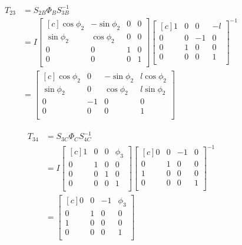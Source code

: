 \documentclass[onecolumn,10pt]{jhwhw}
\begin{document}
\begin{align*}
T_{23} &= S_{2B} \Phi_B S_{3B}^{-1} \\
&= I 
\begin{bmatrix*}[c]
\cos \phi_2 & -\sin \phi_2 & 0 & 0 \\
\sin \phi_2 &  \cos \phi_2 & 0 & 0 \\
          0 &            0 & 1 & 0 \\
          0 &            0 & 0 & 1 \\
\end{bmatrix*}
\begin{bmatrix*}[c]
1 & 0 & 0 & -l \\
0 & 0 & -1 & 0 \\
0 & 1 & 0 & 0 \\
0 & 0 & 0 & 1 \\
\end{bmatrix*}^{-1} \\
&= 
\begin{bmatrix*}[c]
\cos \phi_2 &  0 & -\sin \phi_2 & l \cos \phi_2 \\
\sin \phi_2 &  0 &  \cos \phi_2 & l \sin \phi_2 \\
        0 & -1 &          0 &           0 \\
        0 &  0 &          0 &           1 \\
\end{bmatrix*}
\end{align*}

\begin{align*}
T_{34} &= S_{3C} \Phi_C S_{4C}^{-1} \\
&= I 
\begin{bmatrix*}[c]
          1 &            0 & 0 & \phi_3 \\
          0 &            1 & 0 & 0 \\
          0 &            0 & 1 & 0 \\
          0 &            0 & 0 & 1 \\
\end{bmatrix*}
\begin{bmatrix*}[c]
0 & 0 & -1 & 0 \\
0 & 1 & 0 & 0 \\
1 & 0 & 0 & 0 \\
0 & 0 & 0 & 1 \\
\end{bmatrix*}^{-1} \\
&= 
\begin{bmatrix*}[c]
0 &  0 & -1 & \phi_3 \\
0 &  1 &  0 &    0 \\
1 &  0 &  0 &    0 \\
0 &  0 &  0 &    1 \\
\end{bmatrix*}
\end{align*}
\end{document}
